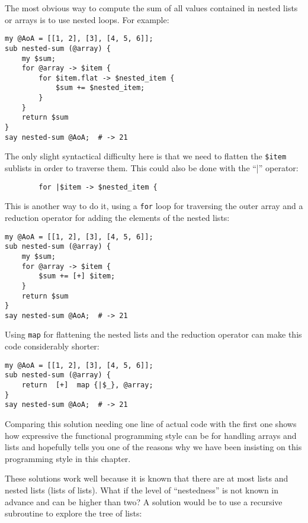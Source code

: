 The most obvious way to compute the sum of all values contained 
in nested lists or arrays is to use nested loops. For example:

\begin{verbatim}
my @AoA = [[1, 2], [3], [4, 5, 6]];
sub nested-sum (@array) { 
    my $sum; 
    for @array -> $item { 
        for $item.flat -> $nested_item {
            $sum += $nested_item;
        }
    } 
    return $sum
}
say nested-sum @AoA;  # -> 21
\end{verbatim}

The only slight syntactical difficulty here is that 
we need to flatten the \verb'$item' sublists in order 
to traverse them. This could also be done with the ``|'' 
operator:
\begin{verbatim}
        for |$item -> $nested_item {
\end{verbatim}

This is another way to do it, using a {\tt for} loop for 
traversing the outer array and a reduction operator 
for adding the elements of the nested lists:

\begin{verbatim}
my @AoA = [[1, 2], [3], [4, 5, 6]];
sub nested-sum (@array) { 
    my $sum; 
    for @array -> $item { 
        $sum += [+] $item;
    } 
    return $sum
}
say nested-sum @AoA;  # -> 21
\end{verbatim}

Using {\tt map} for flattening the nested lists and 
the reduction operator can make this code considerably 
shorter:

\begin{verbatim}
my @AoA = [[1, 2], [3], [4, 5, 6]];
sub nested-sum (@array) { 
    return  [+]  map {|$_}, @array;
}
say nested-sum @AoA;  # -> 21
\end{verbatim}

Comparing this solution needing one line of actual code 
with the first one shows how expressive the functional 
programming style can be for handling arrays and lists 
and hopefully tells you one of the reasons why we have 
been insisting on this programming style in this 
chapter.

These solutions work well because it is known that there 
are at most lists and nested lists (lists of lists). What 
if the level of ``nestedness'' is not known in advance 
and can be higher than two? A solution would be to use 
a recursive subroutine to explore the tree of lists:

